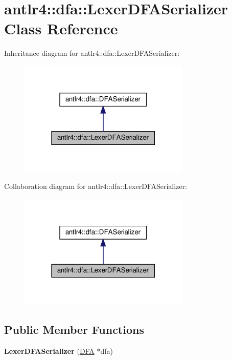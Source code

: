 \hypertarget{classantlr4_1_1dfa_1_1LexerDFASerializer}{}\section{antlr4\+:\+:dfa\+:\+:Lexer\+D\+F\+A\+Serializer Class Reference}
\label{classantlr4_1_1dfa_1_1LexerDFASerializer}


Inheritance diagram for antlr4\+:\+:dfa\+:\+:Lexer\+D\+F\+A\+Serializer\+:
\nopagebreak
\begin{figure}[H]
\begin{center}
\leavevmode
\includegraphics[width=231pt]{classantlr4_1_1dfa_1_1LexerDFASerializer__inherit__graph}
\end{center}
\end{figure}


Collaboration diagram for antlr4\+:\+:dfa\+:\+:Lexer\+D\+F\+A\+Serializer\+:
\nopagebreak
\begin{figure}[H]
\begin{center}
\leavevmode
\includegraphics[width=231pt]{classantlr4_1_1dfa_1_1LexerDFASerializer__coll__graph}
\end{center}
\end{figure}
\subsection*{Public Member Functions}
\begin{DoxyCompactItemize}
\item 
\mbox{\label{classantlr4_1_1dfa_1_1LexerDFASerializer_a2347c2af48c504701df9ffafb94b0ee7}} 
{\bfseries Lexer\+D\+F\+A\+Serializer} (\hyperlink{classantlr4_1_1dfa_1_1DFA}{D\+FA} $\ast$dfa)
\end{DoxyCompactItemize}
